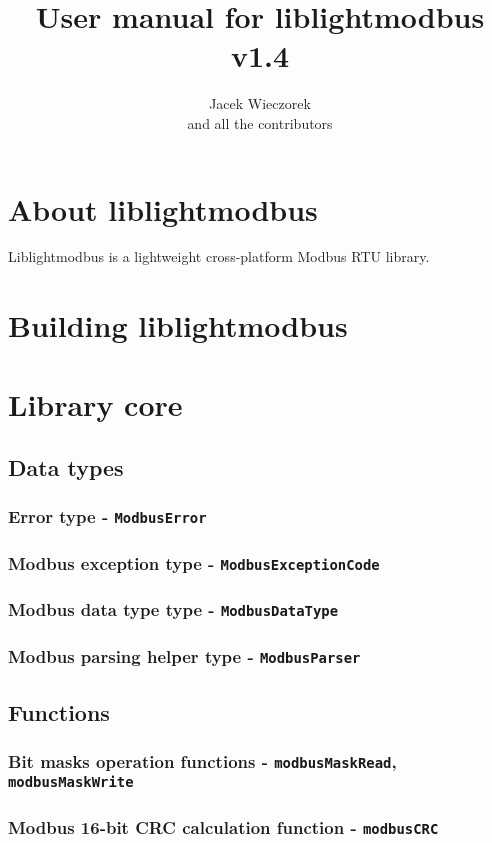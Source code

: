 \documentclass[11pt,a4paper]{article}
\title{\textbf{User manual for liblightmodbus v1.4}}
\author{Jacek Wieczorek\\and all the contributors}
\begin{document}
\maketitle
\thispagestyle{empty}
\newpage

\tableofcontents
\newpage

\section{About liblightmodbus}
Liblightmodbus is a lightweight cross-platform Modbus RTU library.

\section{Building liblightmodbus}

\section{Library core}
\subsection{Data types}
\subsubsection{Error type - \texttt{ModbusError}}
\subsubsection{Modbus exception type - \texttt{ModbusExceptionCode}}
\subsubsection{Modbus data type type - \texttt{ModbusDataType}}
\subsubsection{Modbus parsing helper type - \texttt{ModbusParser}}
\subsection{Functions}
\subsubsection{Bit masks operation functions - \texttt{modbusMaskRead}, \texttt{modbusMaskWrite}}
\subsubsection{Modbus 16-bit CRC calculation function - \texttt{modbusCRC}}
\end{document}

